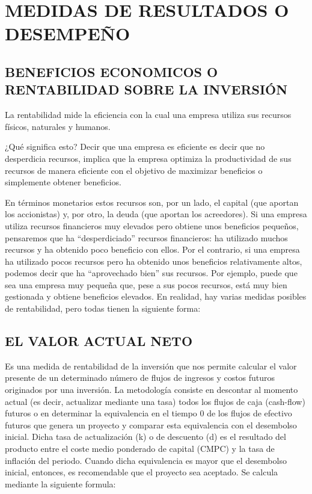 \documentclass[
  letterpaper,
  DIV=11,
  numbers=noendperiod]{scrartcl}
\begin{document}
\hypertarget{medidas-de-resultados-o-desempeuxf1o-1}{%
\section{MEDIDAS DE RESULTADOS O
DESEMPEÑO}\label{medidas-de-resultados-o-desempeuxf1o-1}}

\hypertarget{beneficios-economicos-o-rentabilidad-sobre-la-inversiuxf3n}{%
\subsection{BENEFICIOS ECONOMICOS O RENTABILIDAD SOBRE LA
INVERSIÓN}\label{beneficios-economicos-o-rentabilidad-sobre-la-inversiuxf3n}}

La rentabilidad mide la eficiencia con la cual una empresa utiliza sus
recursos físicos, naturales y humanos.

¿Qué significa esto? Decir que una empresa es eficiente es decir que no
desperdicia recursos, implica que la empresa optimiza la productividad
de sus recursos de manera eficiente con el objetivo de maximizar
beneficios o simplemente obtener beneficios.

En términos monetarios estos recursos son, por un lado, el capital (que
aportan los accionistas) y, por otro, la deuda (que aportan los
acreedores). Si una empresa utiliza recursos financieros muy elevados
pero obtiene unos beneficios pequeños, pensaremos que ha
``desperdiciado'' recursos financieros: ha utilizado muchos recursos y
ha obtenido poco beneficio con ellos. Por el contrario, si una empresa
ha utilizado pocos recursos pero ha obtenido unos beneficios
relativamente altos, podemos decir que ha ``aprovechado bien'' sus
recursos. Por ejemplo, puede que sea una empresa muy pequeña que, pese a
sus pocos recursos, está muy bien gestionada y obtiene beneficios
elevados. En realidad, hay varias medidas posibles de rentabilidad, pero
todas tienen la siguiente forma:

\hypertarget{el-valor-actual-neto}{%
\subsection{EL VALOR ACTUAL NETO}\label{el-valor-actual-neto}}

Es una medida de rentabilidad de la inversión que nos permite calcular
el valor presente de un determinado número de flujos de ingresos y
costos futuros originados por una inversión. La metodología consiste en
descontar al momento actual (es decir, actualizar mediante una tasa)
todos los flujos de caja (cash-flow) futuros o en determinar la
equivalencia en el tiempo 0 de los flujos de efectivo futuros que genera
un proyecto y comparar esta equivalencia con el desembolso inicial.
Dicha tasa de actualización (k) o de descuento (d) es el resultado del
producto entre el coste medio ponderado de capital (CMPC) y la tasa de
inflación del periodo. Cuando dicha equivalencia es mayor que el
desembolso inicial, entonces, es recomendable que el proyecto sea
aceptado. Se calcula mediante la siguiente formula:
\end{document}
